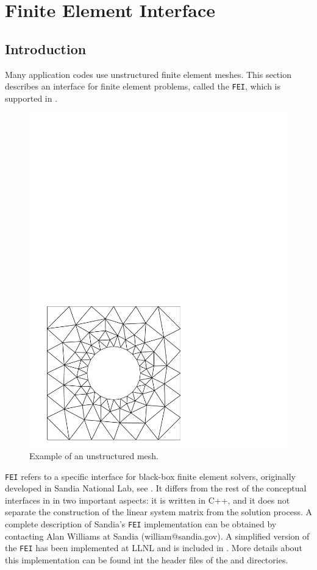 \chapter{Finite Element Interface}
\label{ch-FEI}

\section{Introduction}

Many application codes use unstructured finite element meshes.
This section describes an interface for finite element problems,
called the {\tt FEI}, which is supported in \hypre{}.
\begin{figure}[htbp]
\centerline{\includegraphics[width=.3\textwidth]{square-hole.pdf}}
\caption{Example of an unstructured mesh.}
\end{figure}

{\tt FEI} refers to a specific interface for black-box finite element
solvers, originally developed in Sandia National Lab, see \cite{FEI-ref}.
It differs from the rest of the conceptual interfaces in
\hypre{} in two important aspects: it is written in C++, and
it does not separate the construction of the linear system matrix
from the solution process.
A complete description of Sandia's {\tt FEI} implementation can be obtained
by contacting Alan Williams at Sandia (william@sandia.gov).
A simplified version of the {\tt FEI} has been implemented
at LLNL and is included in \hypre{}.
More details about this implementation can be found int the header
files of the  and  directories.


